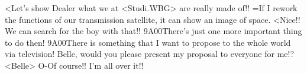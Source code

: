 <Let's show Dealer what we at <Studi.WBG> are really made of!! 
=If I rework the functions of our transmission satellite, it can show an image of space. 
<Nice!! We can search for the boy with that!! 
{9A}{00}There's just one more important thing to do then! 
{9A}{00}There is something that I want to propose to the whole world via television! 
Belle, would you please present my proposal to everyone for me!? 
<Belle> O-Of course!! I'm all over it!! 
